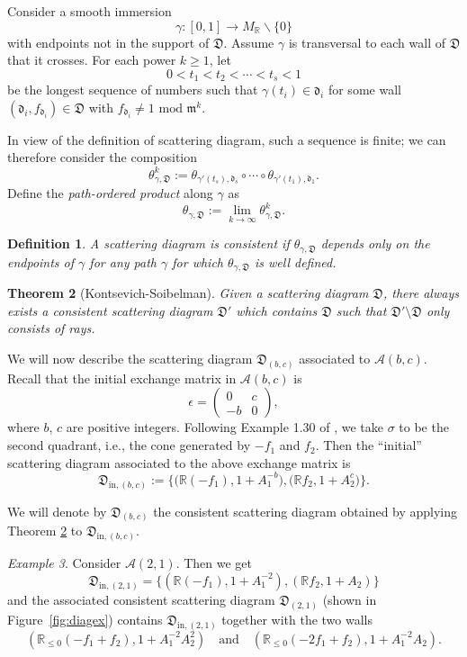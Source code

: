 \documentclass[11pt]{amsart}
\newtheorem{theorem}{Theorem}[section]
\newtheorem{defn}[theorem]{Definition}
\theoremstyle{remark}
\newtheorem{example}[theorem]{Example}
\numberwithin{equation}{section}
\newcommand{\RR}{\mathbb{R}}
\newcommand{\cA}{\mathcal{A}}
\newcommand{\dd}{\mathfrak{d}}
\newcommand{\DD}{\mathfrak{D}}
\newcommand{\fom}{\mathfrak{m}}
\begin{document}
Consider a smooth immersion
\[  
  \gamma: [0,1] \rightarrow M_{\mathbb{R}} \backslash  \{0 \}  
\]
with endpoints not in the support of $\DD$. Assume $\gamma$ is transversal to
each wall of $\DD$ that it crosses. For each power $k \geq 1$, let  
\[
  0< t_1 <  t_2 < \cdots < t_s < 1 
\]
be the longest sequence of numbers such that $\gamma(t_i)\in\dd_i$ for some wall
$(\dd_i,f_{\dd_i}) \in \DD$ with $f_{\dd_i} \neq 1 \text{ mod } \fom^k$.

In view of the definition of scattering diagram, such a sequence is finite; we
can therefore consider the composition 
\[
  \theta^k_{\gamma, \DD} :=
  \theta_{\gamma'(t_s),\dd_s} \circ \cdots \circ \theta_{\gamma'(t_1),\dd_1}.
\]
Define the \textit{path-ordered product} along $\gamma$ as
\[
  \theta_{\gamma, \DD} := \lim_{k \rightarrow \infty} \theta ^k_{\gamma, \DD}. 
\]

\begin{defn}
  A scattering diagram is \emph{consistent} if $\theta _{\gamma, \DD}$ depends
  only on the endpoints of $\gamma$ for any path $\gamma$ for which
  $\theta_{\gamma, \DD}$ is well defined.
\end{defn}

\begin{theorem}[Kontsevich-Soibelman] 
  \label{KS}
  Given a scattering diagram $\DD$, there always exists a consistent scattering
  diagram $\DD'$ which contains $\DD$ such that $\DD'\setminus\DD$ only consists
  of rays.
\end{theorem}

We will now describe the scattering diagram $\DD_{(b,c)}$ associated to 
$\cA(b,c)$.
Recall that the initial exchange matrix in $\cA(b,c)$ is 
\[
  \epsilon = \begin{pmatrix} 0 & c\\ -b & 0\end{pmatrix},
\]
where $b$, $c$ are positive integers.  Following Example 1.30 of \cite{GHKK}, we
take $\sigma$ to be the second quadrant, i.e., the cone generated by $-f_1$ and
$f_2$. Then the ``initial'' scattering diagram associated to the above exchange
matrix is
\[
  \DD_{\mathrm{in},(b,c)} := 
  \big\{
    \big( \RR (-f_1), 1+A_1^{-b}\big), 
    \big( \RR f_2, 1+A_2^c\big) 
  \big\}.
\]

We will denote by $\DD_{(b,c)}$ the consistent scattering diagram obtained by
applying Theorem \ref{KS} to $\DD_{\mathrm{in},(b,c)}$.

\begin{example} 
  \label{ex}
  Consider $\cA(2,1)$. Then we get
  \[
    \DD_{\mathrm{in},(2,1)} =  
    \{ 
      (\RR (-f_1), 1+A_1^{-2}), 
      (\RR f_2, 1+A_2)  
    \}   
  \]
  and the associated consistent scattering diagram $\DD_{(2,1)}$ (shown in
  Figure~\ref{fig:diagex}) contains $\DD_{\mathrm{in},(2,1)}$ together with
  the two walls
  \[ 
    \left( \RR_{\leq 0} (-f_1+f_2), 1+A_1^{-2}A_2^2 \right)
    \quad \mbox{and} \quad
    \left( \RR_{\leq 0} (-2f_1+f_2), 1+A_1^{-2}A_2 \right).
  \]
\end{example}
\end{document}

